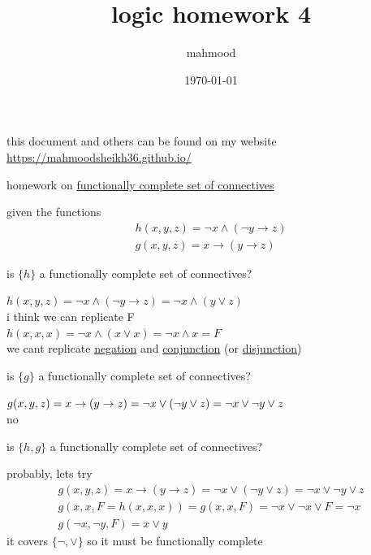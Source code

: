 \documentclass[a4paper,12pt]{article}
\author{mahmood}
\date{\today}
\title{logic homework 4}
\begin{document}
\maketitle
\begin{note}
this document and others can be found on my website\\
\url{https://mahmoodsheikh36.github.io/}
\end{note}
homework on \href{20230516123401-functionally_complete_set_of_connectives.org}{functionally complete set of connectives}\\
\begin{question}
given the functions\\
\begin{gather*}
  h(x,y,z) = \lnot x \land (\lnot y \to z)\\
  g(x,y,z) = x \to (y \to z)
\end{gather*}
\begin{subquestion}
is \(\{h\}\) a functionally complete set of connectives?\\
\begin{answer}
\(h(x,y,z) = \lnot x \land (\lnot y \to z) = \lnot x \land (y \lor z)\)\\
i think we can replicate F\\
\(h(x,x,x)=\lnot x \land (x \lor x) = \lnot x \land x = F\)\\
we cant replicate \href{20230422184813-negation.org}{negation} and \href{20230422184822-conjunction.org}{conjunction} (or \href{20230422184826-disjunction.org}{disjunction})\\
\end{answer}
\end{subquestion}
\begin{subquestion}
is \(\{g\}\) a functionally complete set of connectives?\\
\begin{answer}
\(g(x,y,z) = x \to (y \to z) = \lnot x \lor (\lnot y \lor z) = \lnot x \lor \lnot y \lor z\\\)\\
no\\
\end{answer}
\end{subquestion}
\begin{subquestion}
is \(\{h,g\}\) a functionally complete set of connectives?\\
\begin{answer}
probably, lets try\\
\begin{gather*}
  g(x,y,z) = x \to (y \to z) = \lnot x \lor (\lnot y \lor z) = \lnot x \lor \lnot y \lor z\\
  g(x,x,F=h(x,x,x)) = g(x,x,F) = \lnot x \lor \lnot x \lor F = \lnot x\\
  g(\lnot x,\lnot y,F) = x \lor y
\end{gather*}
it covers \(\{\lnot, \lor\}\) so it must be functionally complete\\
\end{answer}
\end{subquestion}
\end{question}
\end{document}
